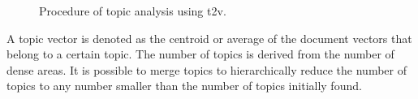\begin{figure}[!htb] %
    \centering
    
    \caption{Procedure of topic analysis using \acs*{t2v}.}
    \label{fig:top2vec}
\end{figure}

A topic vector is denoted as the centroid or average of the document vectors that belong to a certain topic.
The number of topics is derived from the number of dense areas.
It is possible to merge topics to hierarchically reduce the number of topics to any number smaller than the number of topics initially found.